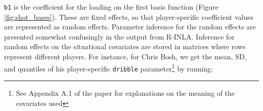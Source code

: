 \documentclass{article}\usepackage[]{graphicx}\usepackage[]{color}
\makeatletter
\newcommand{\hlnum}[1]{\textcolor[rgb]{0.686,0.059,0.569}{#1}}%
\newcommand{\hlstr}[1]{\textcolor[rgb]{0.192,0.494,0.8}{#1}}%
\newcommand{\hlcom}[1]{\textcolor[rgb]{0.678,0.584,0.686}{\textit{#1}}}%
\newcommand{\hlopt}[1]{\textcolor[rgb]{0,0,0}{#1}}%
\newcommand{\hlstd}[1]{\textcolor[rgb]{0.345,0.345,0.345}{#1}}%
\newcommand{\hlkwb}[1]{\textcolor[rgb]{0.69,0.353,0.396}{#1}}%
\newcommand{\hlkwd}[1]{\textcolor[rgb]{0.737,0.353,0.396}{\textbf{#1}}}%
\newenvironment{kframe}{%
 \def\at@end@of@kframe{}%
 \ifinner\ifhmode%
  \def\at@end@of@kframe{\end{minipage}}%
  \begin{minipage}{\columnwidth}%
 \fi\fi%
 \def\FrameCommand##1{\hskip\@totalleftmargin \hskip-\fboxsep
 \colorbox{shadecolor}{##1}\hskip-\fboxsep
     \hskip-\linewidth \hskip-\@totalleftmargin \hskip\columnwidth}%
 \MakeFramed {\advance\hsize-\width
   \@totalleftmargin\z@ \linewidth\hsize
   \@setminipage}}%
 {\par\unskip\endMakeFramed%
 \at@end@of@kframe}
\makeatother
\begin{document}

\texttt{b1} is the coefficient for the loading on the first basis function (Figure \ref{fig:shot_bases}). These are fixed effects, so that player-specific coefficient values are represented as random effects. Parameter inference for the random effects are presented somewhat confusingly in the output from R-INLA. Inference for random effects on the situational covariates are stored in matrices where rows represent different players. For instance, for Chris Bosh, we get the mean, SD, and quantiles of his player-specific \texttt{dribble} parameter\footnote{See Appendix A.1 of the paper for explanations on the meaning of the covariates used} by running:
\end{document}

